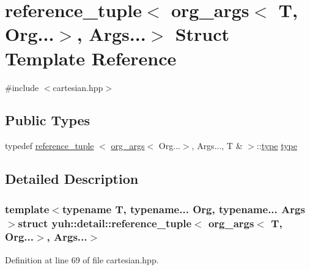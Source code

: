 \hypertarget{structyuh_1_1detail_1_1reference__tuple_3_01org__args_3_01T_00_01Org_8_8_8_4_00_01Args_8_8_8_4}{\section{reference\-\_\-tuple$<$ org\-\_\-args$<$ \-T, \-Org...$>$, \-Args...$>$ \-Struct \-Template \-Reference}
\label{d9/d25/structyuh_1_1detail_1_1reference__tuple_3_01org__args_3_01T_00_01Org_8_8_8_4_00_01Args_8_8_8_4}
}


{\ttfamily \#include $<$cartesian.\-hpp$>$}

\subsection*{\-Public \-Types}
\begin{DoxyCompactItemize}
\item 
typedef \hyperlink{structyuh_1_1detail_1_1reference__tuple}{reference\-\_\-tuple}\*
$<$ \hyperlink{structyuh_1_1detail_1_1org__args}{org\-\_\-args}$<$ \-Org...$>$, \-Args..., \*
\-T \& $>$\-::\hyperlink{structyuh_1_1detail_1_1reference__tuple_3_01org__args_3_01T_00_01Org_8_8_8_4_00_01Args_8_8_8_4_aa39f06150f5b32cac0af75bb2f752b94}{type} \hyperlink{structyuh_1_1detail_1_1reference__tuple_3_01org__args_3_01T_00_01Org_8_8_8_4_00_01Args_8_8_8_4_aa39f06150f5b32cac0af75bb2f752b94}{type}
\end{DoxyCompactItemize}


\subsection{\-Detailed \-Description}
\subsubsection*{template$<$typename T, typename... \-Org, typename... \-Args$>$struct yuh\-::detail\-::reference\-\_\-tuple$<$ org\-\_\-args$<$ T, Org...$>$, Args...$>$}



\-Definition at line 69 of file cartesian.\-hpp.




